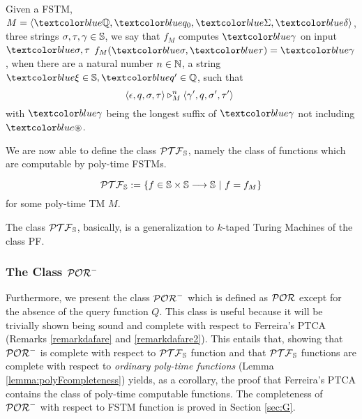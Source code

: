 \begin{defn}\label{df:FSTMcomputation}
Given a  FSTM,
$M = \langle \m{\Qs}, \m{q_0}, \m{\Sigma}, \m{\delta}\rangle$,
three strings $\sigma, \tau, \gamma \in \mathbb{S}$,
we say that
$f_M$ computes $\m{\gamma}$ on input $\m{\sigma, \tau}$
$f_M (\m{\sigma},\m{\tau})=\m{\gamma}$,
when there are a natural number $n\in \mathbb{N}$,
a string $\m{\xi}\in \Ss, \m{q'} \in \Qs$,
such that
$$
\langle \epsilon, q, \sigma, \tau\rangle \triangleright^n_M
\langle \gamma',  q, \sigma', \tau'\rangle\
$$
with $\m{\gamma}$ being
the longest suffix of $\m{\gamma}$ not including
$\m{\blank}$.
\end{defn}




We are now able to define the class
$\mathcal{PTF}_{\mathbb{S}}$, namely the class of functions
which are computable by poly-time FSTMs.



\begin{defn}\label{df:poly-time}
$$
\polyF := \{f \in \Ss \times \Ss \map \Ss \ | \ f=f_M\}
$$
for some poly-time TM $M$.
\end{defn}


The class $\mathcal{PTF}_{\mathbb{S}}$, basically, is a generalization to $k$-taped Turing Machines
of the class PF.









\subsubsection{The Class $\mathcal{POR}^-$}
\label{sub:por-o}

%
Furthermore, we present the class
$\mathcal{POR}^-$ which is defined as
$\mathcal{POR}$ except for the
absence of the query function $Q$.
%
This class is useful because it will be trivially shown being
sound and complete with respect
to Ferreira's PTCA \cite{}
(Remarks \ref{remarkdafare} and \ref{remarkdafare2}).
%
This entails that, showing that $\mathcal{POR}^-$ is complete
with respect to $\mathcal{PTF}_{\mathbb{S}}$ function
and that $\mathcal{PTF}_{\mathbb{S}}$ functions are complete with respect to
\emph{ordinary poly-time functions} (Lemma \ref{lemma:polyFcompleteness})
yields, as a corollary, the proof that
Ferreira's PTCA contains the class of poly-time
computable functions.
%
The completeness of $\mathcal{POR}^-$ with
respect to FSTM function is proved in Section \ref{sec:G}.



